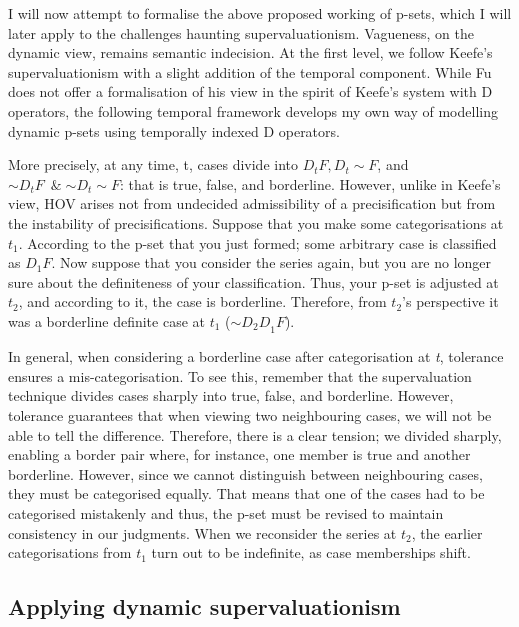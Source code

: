 I will now attempt to formalise the above proposed working of p-sets,
which I will later apply to the challenges haunting supervaluationism.
Vagueness, on the dynamic view, remains semantic indecision. At the
first level, we follow Keefe's supervaluationism with a slight addition
of the temporal component. While Fu does not offer a formalisation of
his view in the spirit of Keefe's system with D operators, the following
temporal framework develops my own way of modelling dynamic p-sets using
temporally indexed D operators.

More precisely, at any time, t, cases divide into
\(D_{t}F,D_{t}{\sim}F\), and \({{\sim}D}_{t}F\ \; \& \; {{\sim}D}_{t}{\sim}F\):
that is true, false, and borderline. However, unlike in Keefe's view,
HOV arises not from undecided admissibility of a precisification but
from the instability of precisifications. Suppose that you make some
categorisations at \(t_{1}\). According to the p-set that you just
formed; some arbitrary case is classified as \(D_{1}F\). Now suppose
that you consider the series again, but you are no longer sure about the
definiteness of your classification. Thus, your p-set is adjusted at
\(t_{2}\), and according to it, the case is borderline. Therefore, from
\(t_{2}\)'s perspective it was a borderline definite case at \(t_{1}\)
(\({{\sim}D_{2}D}_{1}F\)).

In general, when considering a borderline case after categorisation at
\emph{t}, tolerance ensures a mis-categorisation. To see this, remember
that the supervaluation technique divides cases sharply into true,
false, and borderline. However, tolerance guarantees that when viewing
two neighbouring cases, we will not be able to tell the difference.
Therefore, there is a clear tension; we divided sharply, enabling a
border pair where, for instance, one member is true and another
borderline. However, since we cannot distinguish between neighbouring
cases, they must be categorised equally. That means that one of the
cases had to be categorised mistakenly and thus, the p-set must be
revised to maintain consistency in our judgments. When we reconsider the
series at \(t_{2}\), the earlier categorisations from \(t_{1}\) turn out
to be indefinite, as case memberships shift.

\subsection{Applying dynamic supervaluationism}

